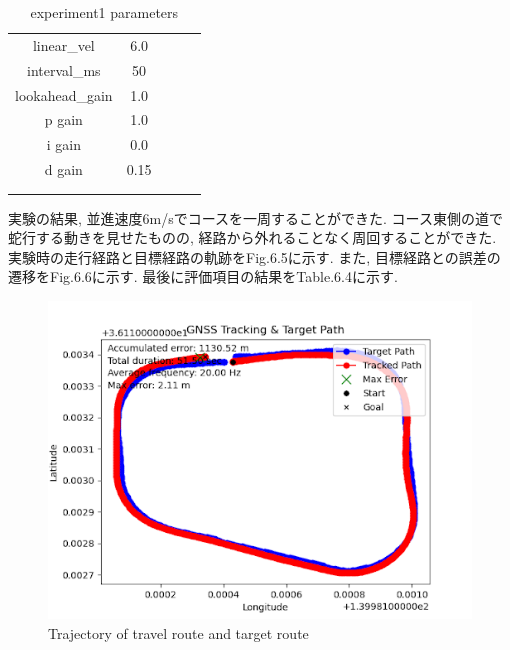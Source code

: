 \begin{table}[H]
     \centering
     \caption{experiment1 parameters}
     \begin{tabular}{cclll}
     \multicolumn{1}{c|}{linear\_vel}     & 6.0  &  &  &  \\
     \multicolumn{1}{c|}{interval\_ms}    & 50   &  &  &  \\
     \multicolumn{1}{c|}{lookahead\_gain} & 1.0  &  &  &  \\
     \multicolumn{1}{c|}{p gain}          & 1.0  &  &  &  \\
     \multicolumn{1}{c|}{i gain}          & 0.0  &  &  &  \\
     \multicolumn{1}{c|}{d gain}          & 0.15 &  &  &  \\
     \multicolumn{1}{l}{}                 &      &  &  &  \\
     \multicolumn{1}{l}{}                 &      &  &  & 
     \end{tabular}
\end{table}

実験の結果, 並進速度6m/sでコースを一周することができた.
コース東側の道で蛇行する動きを見せたものの, 経路から外れることなく周回することができた.
実験時の走行経路と目標経路の軌跡をFig.6.5に示す.
また, 目標経路との誤差の遷移をFig.6.6に示す.
最後に評価項目の結果をTable.6.4に示す.

\begin{figure}[H]
     \centering
    \includegraphics[keepaspectratio, scale=0.7]
         {images/6mspath2.png}
    \caption{Trajectory of travel route and target route}
    \label{fig:path}
\end{figure}

